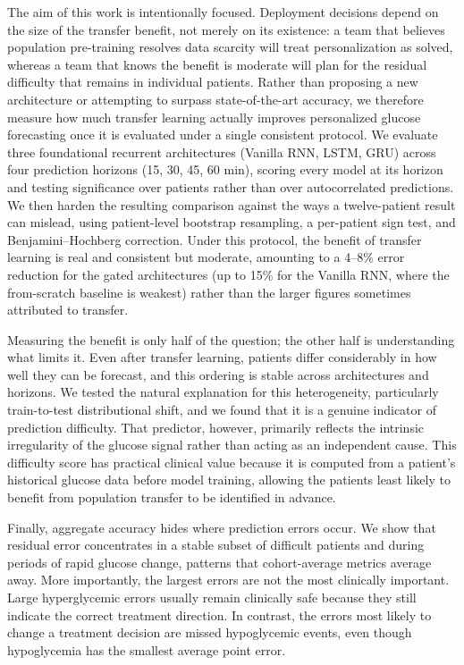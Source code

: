 \documentclass[conference]{IEEEtran}
\begin{document}
The aim of this work is intentionally focused. Deployment decisions depend on the
size of the transfer benefit, not merely on its existence: a team that believes
population pre-training resolves data scarcity will treat personalization as
solved, whereas a team that knows the benefit is moderate will plan for the
residual difficulty that remains in individual patients. Rather than proposing a
new architecture or attempting to surpass state-of-the-art accuracy, we therefore
measure how much transfer learning actually improves personalized glucose
forecasting once it is evaluated under a single consistent protocol. We evaluate
three foundational recurrent architectures (Vanilla RNN, LSTM, GRU) across four
prediction horizons (15, 30, 45, 60 min), scoring every model at its horizon and testing significance over patients rather than over
autocorrelated predictions. We then harden the resulting comparison against the
ways a twelve-patient result can mislead, using patient-level bootstrap
resampling, a per-patient sign test, and Benjamini--Hochberg correction. Under
this protocol, the benefit of transfer learning is real and consistent but
moderate, amounting to a 4--8\% error reduction for the gated architectures (up to
15\% for the Vanilla RNN, where the from-scratch baseline is weakest) rather than
the larger figures sometimes attributed to transfer.


Measuring the benefit is only half of the question; the other half is
understanding what limits it. Even after transfer learning, patients differ
considerably in how well they can be forecast, and this ordering is stable across
architectures and horizons. We tested the natural explanation for this
heterogeneity, particularly train-to-test distributional shift, and we found that it is a genuine indicator of prediction difficulty. That predictor, however, primarily reflects the intrinsic irregularity of the glucose signal rather than acting as an independent cause. This difficulty score has practical clinical value because it is computed from a patient's historical glucose data before model training, allowing the patients least likely to benefit from population transfer to be identified in advance.

Finally, aggregate accuracy hides where prediction errors occur. We show that residual error concentrates in a stable subset of difficult patients and during periods of rapid glucose change, patterns that cohort-average metrics average away. More importantly, the largest errors are not the most clinically important. Large hyperglycemic errors usually remain clinically safe because they still indicate the correct treatment direction. In contrast, the errors most likely to change a treatment decision are missed hypoglycemic events, even though hypoglycemia has the smallest average point error. 
\end{document}
